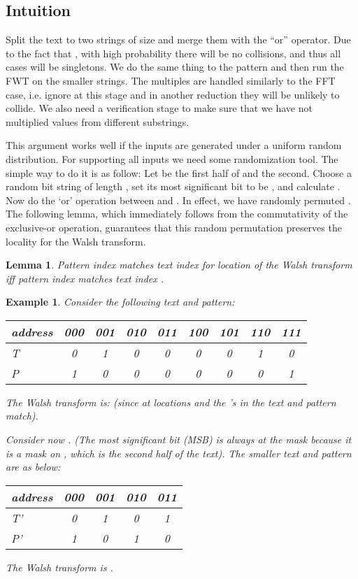 \documentclass[11pt,amssymb]{article}
\newtheorem{lemma}[theorem]{Lemma}
\newtheorem{example}{Example}
\begin{document}
\subsection{Intuition}\label{ss:int_fwt}
Split the text to two strings of size
 and merge them with the ``or'' operator. Due to
the fact that , with high probability there will be no
collisions, and thus all cases will be singletons. We do the same
thing to the pattern and then run the FWT on the smaller strings. The
multiples are handled similarly to the FFT case, i.e. ignore at this
stage and in another reduction they will be unlikely to collide. We
also need a verification stage to make sure that we have not
multiplied values from different substrings.

This argument works well if the inputs are generated under a uniform
random distribution. For supporting all inputs we need some
randomization tool. The simple way to do it is as follow: Let 
be the first half of  and  the second. Choose a random bit
string  of length , set its most significant bit to be
, and calculate . Now do the `or'
operation between  and . In effect, we have randomly
permuted . The following lemma, which immediately follows from
the commutativity of the exclusive-or operation,  guarantees that this 
random permutation preserves the locality for the Walsh transform.

\begin{lemma}\label{l:local_walsh}
Pattern index  matches text index  for location  of the
Walsh transform iff pattern index  matches text index .
\end{lemma}


\begin{example}\label{ex:1} Consider the following text and pattern:

\begin{tabular}{|l|c|c|c|c|c|c|c|c|}
\hline
address & 000 & 001 & 010 & 011 & 100 & 101 & 110 & 111\\
\hline\hline
T & 0 & 1 & 0 & 0 & 0 & 0 & 1 & 0\\
\hline
P & 1 & 0 & 0 & 0 & 0 & 0 & 0 & 1\\
\hline
\end{tabular}

The Walsh transform is:  (since at locations  and
 the 's in the text and pattern match).

Consider now . (The most significant bit (MSB) is always
 at the mask because it is a mask on , which is the second
half of the text). The smaller text and pattern are as below:

\begin{tabular}{|l|c|c|c|c|}
\hline
address & 000 & 001 & 010 & 011 \\
\hline\hline
T' & 0 & 1 & 0 & 1\\
\hline
P' & 1 & 0 & 1 & 0\\
\hline
\end{tabular}

The Walsh transform is . 

\end{example}
\end{document}
